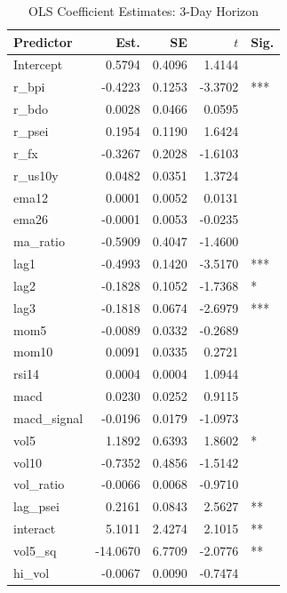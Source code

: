 \begin{table}
\centering
\caption{OLS Coefficient Estimates: 3-Day Horizon}
\label{tab:ols_coef_3d}
\footnotesize
\setlength{\tabcolsep}{6pt}
\begin{tabular*}{\linewidth}{@{\extracolsep{\fill}} l r r r l}
\toprule
Predictor & Est. & SE & $t$ & Sig. \\
\midrule
Intercept & 0.5794 & 0.4096 & 1.4144 &  \\
r\_bpi & -0.4223 & 0.1253 & -3.3702 & *** \\
r\_bdo & 0.0028 & 0.0466 & 0.0595 &  \\
r\_psei & 0.1954 & 0.1190 & 1.6424 &  \\
r\_fx & -0.3267 & 0.2028 & -1.6103 &  \\
r\_us10y & 0.0482 & 0.0351 & 1.3724 &  \\
ema12 & 0.0001 & 0.0052 & 0.0131 &  \\
ema26 & -0.0001 & 0.0053 & -0.0235 &  \\
ma\_ratio & -0.5909 & 0.4047 & -1.4600 &  \\
lag1 & -0.4993 & 0.1420 & -3.5170 & *** \\
lag2 & -0.1828 & 0.1052 & -1.7368 & * \\
lag3 & -0.1818 & 0.0674 & -2.6979 & *** \\
mom5 & -0.0089 & 0.0332 & -0.2689 &  \\
mom10 & 0.0091 & 0.0335 & 0.2721 &  \\
rsi14 & 0.0004 & 0.0004 & 1.0944 &  \\
macd & 0.0230 & 0.0252 & 0.9115 &  \\
macd\_signal & -0.0196 & 0.0179 & -1.0973 &  \\
vol5 & 1.1892 & 0.6393 & 1.8602 & * \\
vol10 & -0.7352 & 0.4856 & -1.5142 &  \\
vol\_ratio & -0.0066 & 0.0068 & -0.9710 &  \\
lag\_psei & 0.2161 & 0.0843 & 2.5627 & ** \\
interact & 5.1011 & 2.4274 & 2.1015 & ** \\
vol5\_sq & -14.0670 & 6.7709 & -2.0776 & ** \\
hi\_vol & -0.0067 & 0.0090 & -0.7474 &  \\
\bottomrule
\end{tabular*}
\\
\end{table}
